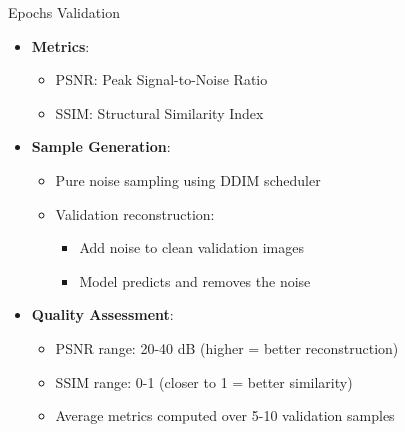\begin{frame}{Epochs Validation}
    \begin{itemize}
        \item \textbf{Metrics}:
              \begin{itemize}
                  \item PSNR: Peak Signal-to-Noise Ratio
                  \item SSIM: Structural Similarity Index
              \end{itemize}
        \item \textbf{Sample Generation}:
              \begin{itemize}
                  \item Pure noise sampling using DDIM scheduler
                  \item Validation reconstruction:
                        \begin{itemize}
                            \item Add noise to clean validation images
                            \item Model predicts and removes the noise
                        \end{itemize}
              \end{itemize}
        \item \textbf{Quality Assessment}:
              \begin{itemize}
                  \item PSNR range: 20-40 dB (higher = better reconstruction)
                  \item SSIM range: 0-1 (closer to 1 = better similarity)
                  \item Average metrics computed over 5-10 validation samples
              \end{itemize}
    \end{itemize}
\end{frame}
